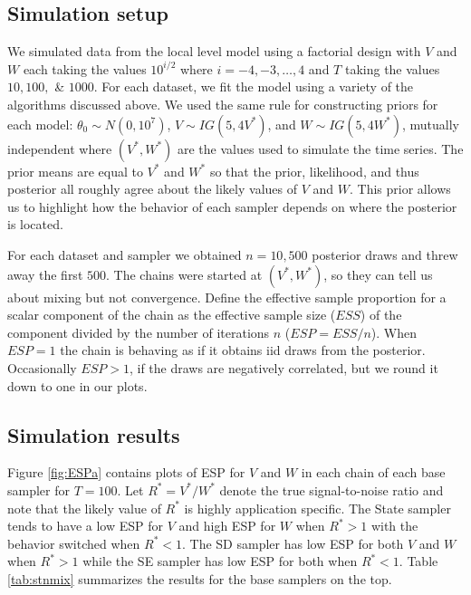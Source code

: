 \documentclass[12pt]{article}
\begin{document}
\subsection{Simulation setup}

We simulated data from the local level model using a factorial design with $V$ and $W$ each taking the values $10^{i/2}$ where $i=-4,-3,\dots,4$ and $T$ taking the values $10, 100,$ \& $1000$. For each dataset, we fit the model using a variety of the algorithms discussed above. We used the same rule for constructing priors for each model: $\theta_0\sim N(0,10^7)$, $V\sim IG(5, 4V^*)$, and $W\sim IG(5, 4W^*)$, mutually independent where $(V^*,W^*)$ are the values used to simulate the time series. The prior means are equal to $V^*$ and $W^*$ so that the prior, likelihood, and thus posterior all roughly agree about the likely values of $V$ and $W$.  This prior allows us to highlight how the behavior of each sampler depends on where the posterior is located.

For each dataset and sampler we obtained $n=10,500$ posterior draws and threw away the first $500$. The chains were started at $(V^*, W^*)$, so they can tell us about mixing but not convergence. Define the effective sample proportion for a scalar component of the chain as the effective sample size ($ESS$) \citep{gelman2013bayesian} of the component divided by the number of iterations $n$ ($ESP=ESS/n$). When $ESP=1$ the chain is behaving as if it obtains iid draws from the posterior. Occasionally $ESP>1$, if the draws are negatively correlated, but we round it down to one in our plots.

\subsection{Simulation results}

Figure \ref{fig:ESPa} contains plots of ESP for $V$ and $W$ in each chain of each base sampler for $T=100$. Let $R^*=V^*/W^*$ denote the true signal-to-noise ratio and note that the likely value of $R^*$ is highly application specific. The State sampler tends to have a low ESP for $V$ and high ESP for $W$ when $R^*>1$ with the behavior switched when $R^*<1$. The SD sampler has low ESP for both $V$ and $W$ when $R^*>1$ while the SE sampler has low ESP for both when $R^*<1$. Table \ref{tab:stnmix} summarizes the results for the base samplers on the top.
\end{document}
